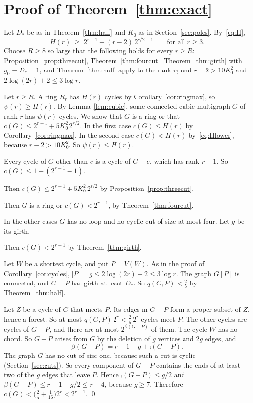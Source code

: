 \section{Proof of Theorem~\ref{thm:exact}}\label{sec:proof}

Let $D_*$ be as in Theorem~\ref{thm:half} and $K_0$ as in Section~\ref{sec:poles}.
By~\eqref{eq:H},
\begin{equation}\label{eq:Hlower}
  H(r)\;\ge\;2^{r-1}+(r-2)\,2^{r/2-1}\qquad\text{for all }r\ge3 .
\end{equation}
Choose $R\ge8$ so large that the following holds for every $r\ge R$:
Proposition~\ref{prop:threecut}, Theorem~\ref{thm:fourcut}, Theorem~\ref{thm:girth} with
$g_0=D_*-1$, and Theorem~\ref{thm:half} apply to the rank $r$; and $r-2>10K_0^{2}$ and
$2\log(2r)+2\le3\log r$.

Let $r\ge R$. A ring $R_r$ has $H(r)$ cycles by Corollary~\ref{cor:ringmax}, so $\psi(r)\ge H(r)$.
By Lemma~\ref{lem:cubic}, some connected cubic multigraph $G$ of rank $r$ has $\psi(r)$ cycles. We
show that $G$ is a ring or that $c(G)\le2^{r-1}+5K_0^{2}\,2^{r/2}$. In the first case
$c(G)\le H(r)$ by Corollary~\ref{cor:ringmax}. In the second case $c(G)<H(r)$ by~\eqref{eq:Hlower},
because $r-2>10K_0^{2}$. So $\psi(r)\le H(r)$.

 Every cycle of $G$ other than $e$ is a cycle of $G-e$, which has
rank $r-1$. So $c(G)\le1+(2^{r-1}-1)$.

 Then
$c(G)\le2^{r-1}+5K_0^{2}\,2^{r/2}$ by Proposition~\ref{prop:threecut}.

 Then $G$ is a ring or $c(G)<2^{r-1}$, by Theorem~\ref{thm:fourcut}.

In the other cases $G$ has no loop and no cyclic cut of size at most four. Let $g$ be its girth.

 Then $c(G)<2^{r-1}$ by Theorem~\ref{thm:girth}.

 Let $W$ be a shortest cycle, and put $P=V(W)$. As in the proof of
Corollary~\ref{cor:cycles}, $|P|=g\le2\log(2r)+2\le3\log r$. The graph $G[P]$ is connected, and
$G-P$ has girth at least $D_*$. So $q(G,P)<\frac25$ by Theorem~\ref{thm:half}.

Let $Z$ be a cycle of $G$ that meets $P$. Its edges in $G-P$ form a proper subset of $Z$, hence a
forest. So at most $q(G,P)\,2^{r}<\frac25\,2^{r}$ cycles meet $P$. The other cycles are cycles of
$G-P$, and there are at most $2^{\beta(G-P)}$ of them. The cycle $W$ has no chord. So $G-P$ arises
from $G$ by the deletion of $g$ vertices and $2g$ edges, and
\[
  \beta(G-P)=r-1-g+\comp(G-P).
\]
The graph $G$ has no cut of size one, because such a cut is cyclic (Section~\ref{sec:cuts}). So
every component of $G-P$ contains the ends of at least two of the $g$ edges that leave $P$. Hence
$\comp(G-P)\le g/2$ and $\beta(G-P)\le r-1-g/2\le r-4$, because $g\ge7$. Therefore
$c(G)<\bigl(\frac25+\frac1{16}\bigr)2^{r}<2^{r-1}$. \qed
